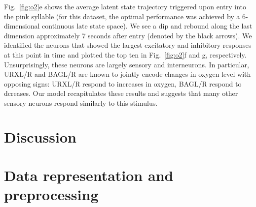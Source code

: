 \documentclass[11pt]{article}
\begin{document}
Fig.~\ref{fig:o2}e shows the average latent state trajectory triggered
upon entry into the pink syllable (for this dataset, the optimal
performance was achieved by a 6-dimensional continuous late state
space).  We see a dip and rebound along the last dimension
approximately 7 seconds after entry (denoted by the black arrows).  We
identified the neurons that showed the largest excitatory and
inhibitory responses at this point in time and plotted the top ten in
Fig.~\ref{fig:o2}f and g, respectively.  Unsurprisingly, these neurons
are largely sensory and interneurons.  In particular, \textsf{URXL/R}
and \textsf{BAGL/R} are known to jointly encode changes in oxygen
level with opposing signs: \textsf{URXL/R} respond to increases in
oxygen, \textsf{BAGL/R} respond to dcreases.  Our model recapitulates
these results and suggests that many other sensory neurons respond
similarly to this stimulus.

\clearpage

\section*{Discussion}

\clearpage




\clearpage

\appendix
{}

\section{Data representation and preprocessing}
\label{sec:data}
\end{document}
